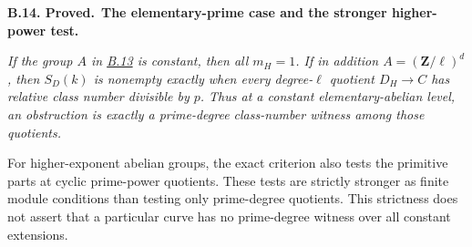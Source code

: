 \documentclass[11pt,a4paper]{article}
\newenvironment{claim}[3]{\par\medskip\noindent\hypertarget{#1}{\textbf{#1. #2.}}\ \textbf{#3.}\par\nopagebreak\smallskip\begingroup\itshape}{\endgroup\par\smallskip}
\newcommand{\statementref}[1]{\hyperlink{#1}{#1}}
\begin{document}
\begin{claim}{B.14}{Proved}{The elementary-prime case and the stronger higher-power test}
If the group $A$ in \statementref{B.13} is constant, then all
$m_H=1$. If in addition $A=(\mathbf Z/\ell)^d$, then
$S_D(k)$ is nonempty exactly when every degree-$\ell$ quotient
$D_H\to C$ has relative class number divisible by $p$.
Thus at a constant elementary-abelian level, an obstruction
is exactly a prime-degree class-number witness among those
quotients.

For higher-exponent abelian groups, the exact criterion also
tests the primitive parts at cyclic prime-power quotients.
These tests are strictly stronger as finite module conditions
than testing only prime-degree quotients. This strictness does
not assert that a particular curve has no prime-degree witness
over all constant extensions.
\end{claim}
\end{document}
